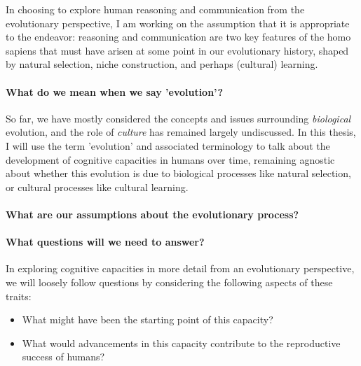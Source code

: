 In choosing to explore human reasoning and communication from the evolutionary perspective, I am working on the assumption that it is appropriate to the endeavor: reasoning and communication are two key features of the homo sapiens that must have arisen at some point in our evolutionary history, shaped by natural selection, niche construction, and perhaps (cultural) learning.

\paragraph{What do we mean when we say 'evolution'?}

So far, we have mostly considered the concepts and issues surrounding \emph{biological} evolution, and the role of \emph{culture} has remained largely undiscussed.
In this thesis, I will use the term 'evolution' and associated terminology to talk about the development of cognitive capacities in humans over time, remaining agnostic about whether this evolution is due to biological processes like natural selection, or cultural processes like cultural learning.

\paragraph{What are our assumptions about the evolutionary process?}

\paragraph{What questions will we need to answer?}
In exploring cognitive capacities in more detail from an evolutionary perspective, we will loosely follow  questions by considering the following aspects of these traits:
\begin{itemize}
    \item What might have been the starting point of this capacity?
    \item What would advancements in this capacity contribute to the reproductive success of humans?
\end{itemize}
